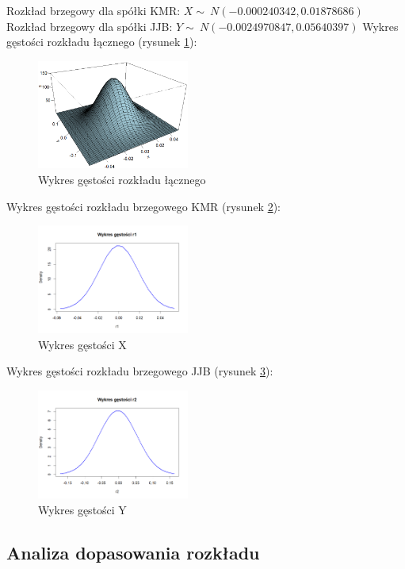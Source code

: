 \documentclass[a4paper,11pt]{article}
\begin{document}
Rozkład brzegowy dla spółki KMR: $ X \sim\ N(-0.000240342, 0.01878686)$
Rozkład brzegowy dla spółki JJB: $ Y \sim\ N(-0.0024970847,0.05640397)$
Wykres gęstości rozkładu łącznego (rysunek \ref{fig:wykres_laczny}):

\begin{figure}[!htb]
	\centering
	\includegraphics[width=5cm]{wykres3d.png}
	\caption{Wykres gęstości rozkładu łącznego }
         \label{fig:wykres_laczny}
\end{figure}

Wykres gęstości rozkładu brzegowego KMR (rysunek \ref{fig:wykres_gestosc_r1}):
\begin{figure}[!htb]
	\centering
	\includegraphics[width=5cm]{wykres_gestosc_r1.png}
	\caption{Wykres gęstości X }
         \label{fig:wykres_gestosc_r1}
\end{figure}

Wykres gęstości rozkładu brzegowego JJB (rysunek \ref{fig:wykres_gestosc_r2}):
\begin{figure}[!htb]
	\centering
	\includegraphics[width=5cm]{wykres_gestosc_r2.png}
	\caption{Wykres gęstości Y }
         \label{fig:wykres_gestosc_r2}
\end{figure}

\subsection{Analiza dopasowania rozkładu}
\end{document}
